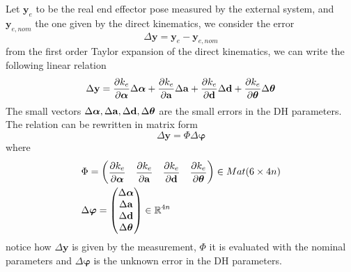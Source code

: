 \documentclass[10pt, a4paper]{report}
\begin{document}
Let $\mathbf y_e$ to be the real end effector pose measured by the external system, and $\mathbf y_{e,nom}$ the one given by the direct kinematics, we consider the error\begin{equation}
    \Delta \mathbf y=\mathbf y_e-\mathbf y_{e,nom}
\end{equation}
from the first order Taylor expansion of the direct kinematics, we can write the following linear relation
\begin{equation}
    \Delta \mathbf y=
    \frac{\partial k_e}{\partial\boldsymbol \alpha}\Delta\boldsymbol \alpha+
     \frac{\partial k_e}{\partial\mathbf a}\Delta\mathbf a+
     \frac{\partial k_e}{\partial\mathbf d}\Delta\mathbf d+
     \frac{\partial k_e}{\partial {\boldsymbol{\theta}}}\Delta{\boldsymbol{\theta}}
\end{equation}
The small vectors $\Delta\boldsymbol \alpha,\Delta\mathbf a,\Delta\mathbf d,\Delta{\boldsymbol{\theta}}$ are the small errors in the DH parameters. The relation can be rewritten in matrix form\begin{equation}
    \Delta\mathbf y=\Phi\Delta\boldsymbol\varphi
\end{equation}
where\begin{align}
    &\Phi=\begin{pmatrix}\displaystyle
         \frac{\partial k_e}{\partial\boldsymbol \alpha}&
         \displaystyle\frac{\partial k_e}{\partial\mathbf a}&
     \displaystyle\frac{\partial k_e}{\partial\mathbf d}&
     \displaystyle\frac{\partial k_e}{\partial {\boldsymbol{\theta}}}
    \end{pmatrix}\in Mat(6\times 4n)\\
    &\Delta\boldsymbol\varphi=\begin{pmatrix}
        \Delta\boldsymbol \alpha\\ 
        \Delta\mathbf a\\ 
        \Delta\mathbf d\\
        \Delta{\boldsymbol{\theta}}
    \end{pmatrix}\in {\mathbb R}^{4n}
\end{align}
notice how $ \Delta \mathbf y$ is given by the measurement, $\Phi$ it is evaluated with the nominal parameters and $\Delta\boldsymbol\varphi$ is the unknown error in the DH parameters. 
\end{document}
